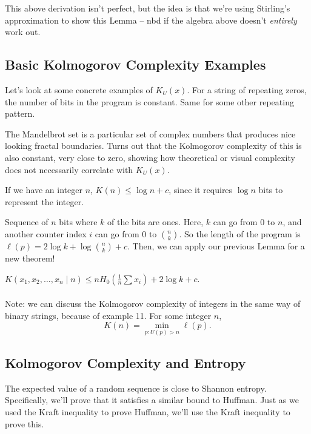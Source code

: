 \documentclass[11pt]{article}
\theoremstyle{definition}
\begin{document}
This above derivation isn't perfect, but the idea is that we're using Stirling's approximation to show this Lemma -- nbd if the algebra above doesn't \textit{entirely} work out.

\subsection{Basic Kolmogorov Complexity Examples}

Let's look at some concrete examples of $K_U(x)$. For a string of repeating zeros, the number of bits in the program is constant. Same for some other repeating pattern.

\example The Mandelbrot set is a particular set of complex numbers that produces nice looking fractal boundaries. Turns out that the Kolmogorov complexity of this is also constant, very close to zero, showing how theoretical or visual complexity does not necessarily correlate with $K_U(x)$.

\example If we have an integer $n$, $K(n) \le \log n + c$, since it requires $\log n$ bits to represent the integer.

\example Sequence of $n$ bits where $k$ of the bits are ones. Here, $k$ can go from $0$ to $n$, and another counter index $i$ can go from $0$ to $\binom nk$. So the length of the program is $\ell(p) = 2 \log k + \log \binom nk + c$. Then, we can apply our previous Lemma for a new theorem!

\theorem $K(x_1,x_2,\dots,x_n \mid n) \le nH_0\left(\frac 1n \sum x_i \right) + 2 \log k + c$.
\\ \\
\noindent Note: we can discuss the Kolmogorov complexity of integers in the same way of binary strings, because of example 11. For some integer $n$, $$K(n) = \min_{p : U(p) > n} \ell(p).$$

\subsection{Kolmogorov Complexity and Entropy}

The expected value of a random sequence is close to Shannon entropy. Specifically, we'll prove that it satisfies a similar bound to Huffman. Just as we used the Kraft inequality to prove Huffman, we'll use the Kraft inequality to prove this.
\end{document}
